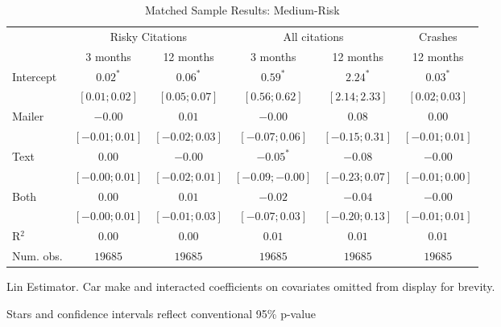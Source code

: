 
\begin{table}
\caption{Matched Sample Results: Medium-Risk}
\begin{center}
\begin{threeparttable}
\begin{tabular}{l c c c c c}
\hline
 & \multicolumn{2}{c}{Risky Citations} & \multicolumn{2}{c}{All citations} & \multicolumn{1}{c}{Crashes} \\
\cline{2-3} \cline{4-5} \cline{6-6}
 & 3 months & 12 months & 3 months & 12 months & 12 months \\
\hline
Intercept & $0.02^{*}$       & $0.06^{*}$       & $0.59^{*}$        & $2.24^{*}$       & $0.03^{*}$       \\
          & $ [ 0.01; 0.02]$ & $ [ 0.05; 0.07]$ & $ [ 0.56;  0.62]$ & $ [ 2.14; 2.33]$ & $ [ 0.02; 0.03]$ \\
Mailer    & $-0.00$          & $0.01$           & $-0.00$           & $0.08$           & $0.00$           \\
          & $ [-0.01; 0.01]$ & $ [-0.02; 0.03]$ & $ [-0.07;  0.06]$ & $ [-0.15; 0.31]$ & $ [-0.01; 0.01]$ \\
Text      & $0.00$           & $-0.00$          & $-0.05^{*}$       & $-0.08$          & $-0.00$          \\
          & $ [-0.00; 0.01]$ & $ [-0.02; 0.01]$ & $ [-0.09; -0.00]$ & $ [-0.23; 0.07]$ & $ [-0.01; 0.00]$ \\
Both      & $0.00$           & $0.01$           & $-0.02$           & $-0.04$          & $-0.00$          \\
          & $ [-0.00; 0.01]$ & $ [-0.01; 0.03]$ & $ [-0.07;  0.03]$ & $ [-0.20; 0.13]$ & $ [-0.01; 0.01]$ \\
\hline
R$^2$     & $0.00$           & $0.00$           & $0.01$            & $0.01$           & $0.01$           \\
Num. obs. & $19685$          & $19685$          & $19685$           & $19685$          & $19685$          \\
\hline
\end{tabular}
\begin{tablenotes}[flushleft]
\scriptsize{\item Lin Estimator. Car make and interacted coefficients on covariates omitted from display for brevity.
                             \item Stars and confidence intervals reflect conventional 95\% p-value}
\end{tablenotes}
\end{threeparttable}
\label{table:coefficients}
\end{center}
\end{table}

